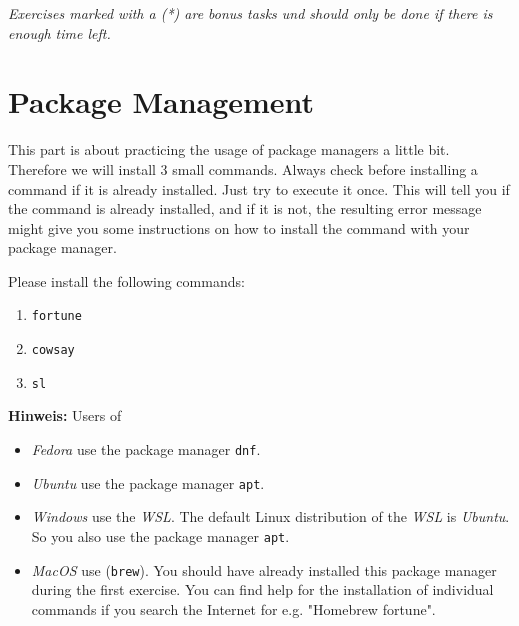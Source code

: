 \documentclass[english]{sheet}
\subtitle{Linux Exercise\textemdash Teil 2}
\begin{document}
\maketitle

\textit{Exercises marked with a (*) are bonus tasks und should only be done if there is enough time left.}

\section{Package Management}

This part is about practicing the usage of package managers a little bit. Therefore we will install 3 small commands. Always check before installing a command if it is already installed. Just try to execute it once. This will tell you if the command is already installed, and if it is not, the resulting error message might give you some instructions on how to install the command with your package manager.

\begin{exercise}
    Please install the following commands:
    \begin{enumerate}
        \item \texttt{fortune}
        \item \texttt{cowsay}
        \item \texttt{sl}
    \end{enumerate}
    \textbf{Hinweis:} Users of
    \begin{itemize}
        \item \emph{Fedora} use the package manager \texttt{dnf}.
        \item \emph{Ubuntu} use the package manager \texttt{apt}.
        \item \emph{Windows} use the \emph{WSL}. The default Linux distribution of the \emph{WSL} is \emph{Ubuntu}. So you also use the package manager \texttt{apt}.
        \item \emph{MacOS} use  (\texttt{brew}). You should have already installed this package manager during the first exercise. You can find help for the installation of individual commands if you search the Internet for e.g. "Homebrew fortune".
    \end{itemize}
\end{exercise}
\end{document}
